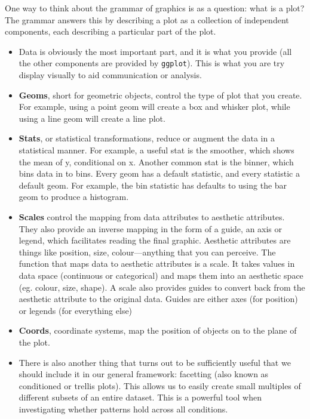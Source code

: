 One way to think about the grammar of graphics is as a question: what is a plot?  The grammar answers this by describing a plot as a collection of independent components, each describing a particular part of the plot.

\begin{itemize}
	\item Data is obviously the most important part, and it is what you provide (all the other components are provided by {\tt ggplot}).  This is what you are try display visually to aid communication or analysis.

	\item {\bf Geoms}, short for geometric objects, control the type of plot that you create.  For example, using a point geom will create a box and whisker plot, while using a line geom will create a line plot.
	
	\item {\bf Stats}, or statistical transformations, reduce or augment the data in a statistical manner.  For example, a useful stat is the smoother, which shows the mean of y, conditional on x.  Another common stat is the binner, which bins data in to bins.   Every geom has a default statistic, and every statistic a default geom.  For example, the bin statistic has defaults to using the bar geom to produce a histogram.

	\item {\bf Scales} control the mapping from data attributes to aesthetic attributes.  They also provide an inverse mapping in the form of a guide, an axis or legend, which facilitates reading the final graphic.  Aesthetic attributes are things like position, size, colour---anything that you can perceive.  The function that maps data to aesthetic attributes is a scale. It takes values in data space (continuous or categorical) and maps them into an aesthetic space (eg. colour, size, shape).  A scale also provides guides to convert back from the aesthetic attribute to the original data.  Guides are either axes (for position) or legends (for everything else)
	
	\item {\bf Coords}, coordinate systems, map the position of objects on to the plane of the plot.
	
	\item There is also another thing that turns out to be sufficiently useful that we should include it in our general framework: facetting (also known as conditioned or trellis plots).  This allows us to easily create small multiples of different subsets of an entire dataset.  This is a powerful tool when investigating whether patterns hold across all conditions.
	
\end{itemize}

